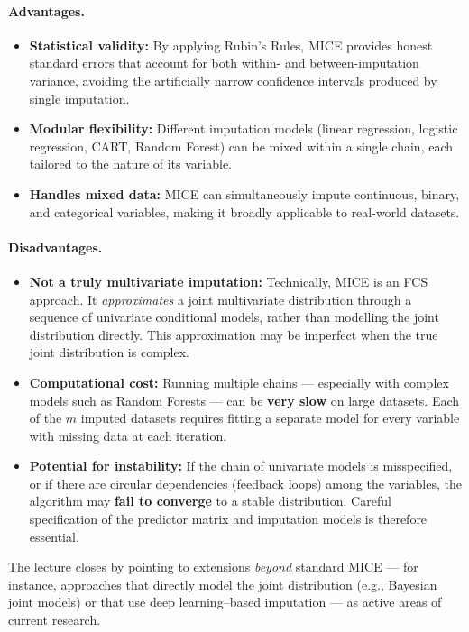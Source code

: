 \documentclass[11pt]{article}
\theoremstyle{smallexample}
\begin{document}
\paragraph{Advantages.}

 \begin{itemize}
  \item \textbf{Statistical validity:} By applying Rubin's Rules, MICE provides
    honest standard errors that account for both within- and between-imputation
    variance, avoiding the artificially narrow confidence intervals produced by
    single imputation.

  \vspace{0.2cm}
  \item \textbf{Modular flexibility:} Different imputation models (linear regression,
    logistic regression, CART, Random Forest) can be mixed within a single chain,
    each tailored to the nature of its variable.

  \vspace{0.2cm}
  \item \textbf{Handles mixed data:} MICE can simultaneously impute continuous,
    binary, and categorical variables, making it broadly applicable to real-world
    datasets.
 \end{itemize}

\paragraph{Disadvantages.}

 \begin{itemize}
  \item \textbf{Not a truly multivariate imputation:} Technically, MICE is an FCS
    approach. It \emph{approximates} a joint multivariate distribution through a
    sequence of univariate conditional models, rather than modelling the joint
    distribution directly. This approximation may be imperfect when the true joint
    distribution is complex.

  \vspace{0.2cm}
  \item \textbf{Computational cost:} Running multiple chains — especially with
    complex models such as Random Forests — can be \textbf{very slow} on large
    datasets. Each of the $m$ imputed datasets requires fitting a separate model
    for every variable with missing data at each iteration.

  \vspace{0.2cm}
  \item \textbf{Potential for instability:} If the chain of univariate models is
    misspecified, or if there are circular dependencies (feedback loops) among the
    variables, the algorithm may \textbf{fail to converge} to a stable distribution.
    Careful specification of the predictor matrix and imputation models is therefore
    essential.
 \end{itemize}

\noindent
The lecture closes by pointing to extensions \emph{beyond} standard MICE —
for instance, approaches that directly model the joint distribution (e.g.,
Bayesian joint models) or that use deep learning–based imputation — as active
areas of current research.
\end{document}

